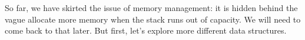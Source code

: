 So far, we have skirted the issue of memory management: it is hidden behind the vague allocate more memory when the stack runs out of capacity. We will need to come back to that later. But first, let's explore more different data structures.


































